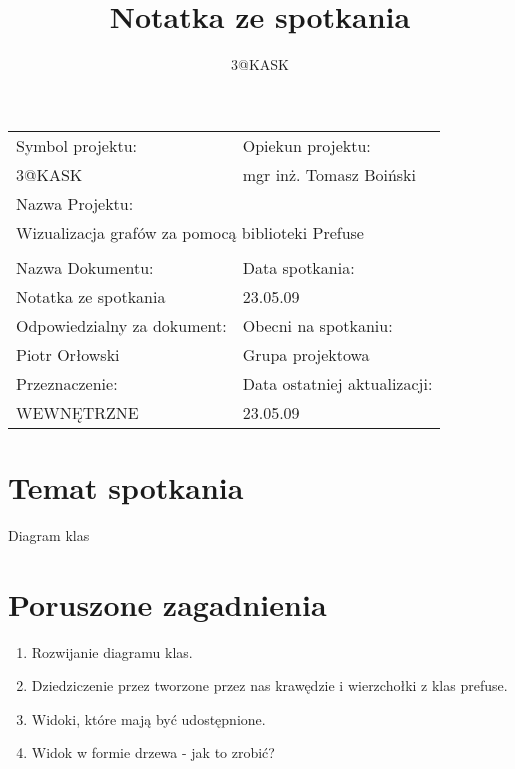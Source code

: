 \documentclass[a4paper,10pt]{article}
\title{Notatka ze spotkania}
\author{3@KASK}
\begin{document}



\maketitle


\begin{center}
\begin{tabular}{|p{7cm}|p{7cm}|}
\hline
Symbol projektu: & Opiekun projektu:   \tabularnewline 
3@KASK & mgr inż. Tomasz Boiński    \tabularnewline \hline
\multicolumn{2}{|l|}{Nazwa Projektu: } \tabularnewline
\multicolumn{2}{|l|}{Wizualizacja grafów za pomocą biblioteki Prefuse } \tabularnewline 
\hline
\multicolumn{2}{l}{ } \tabularnewline %
\hline 
Nazwa Dokumentu: & Data spotkania:   \tabularnewline 
Notatka ze spotkania & 23.05.09 \tabularnewline \hline
Odpowiedzialny za dokument: & Obecni na spotkaniu:   \tabularnewline 
Piotr Orłowski & Grupa projektowa \tabularnewline \hline
Przeznaczenie: & Data ostatniej aktualizacji:   \tabularnewline 
WEWNĘTRZNE & 23.05.09 \tabularnewline \hline
\end{tabular}
\end{center}



\section{Temat spotkania}
Diagram klas

\section{Poruszone zagadnienia}
\begin{enumerate}
\item Rozwijanie diagramu klas.
\item Dziedziczenie przez tworzone przez nas krawędzie i wierzchołki z klas prefuse.
\item Widoki, które mają być udostępnione.
\item Widok w formie drzewa - jak to zrobić? 
\end{enumerate}
\end{document}
